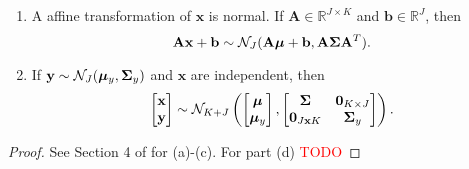 \begin{theorem}
\begin{enumerate}
        \item
            A affine transformation of $\mathbf{x}$ is normal.
            If $\mathbf{A} \in \mathbb{R}^{J \times K}$ and $\mathbf{b} \in \mathbb{R}^{J}$, then
            \begin{equation*}
                \mathbf{Ax} + \mathbf{b} \sim \mathcal{N}_J(
                \mathbf{A} \boldsymbol{\mu} + \mathbf{b},
                \mathbf{A} \boldsymbol{\Sigma} \mathbf{A}^{T}
                ).
            \end{equation*}

        \item
            If $\mathbf{y} \sim \mathcal{N}_J( \boldsymbol{\mu}_y, \boldsymbol{\Sigma}_{y})$ and $\mathbf{x}$ are independent, then
            \begin{equation*}
                \begin{bmatrix}
                    \mathbf{x} \\ \mathbf{y}
                \end{bmatrix} \sim \mathcal{N}_{K + J} \left(
                \begin{bmatrix}
                    \boldsymbol{\mu} \\ \boldsymbol{\mu}_{y}
                \end{bmatrix},
                \begin{bmatrix}
                    \boldsymbol{\Sigma} & \mathbf{0}_{K \times J} \\
                    \mathbf{0}_{J \mathbf{x} K} & \boldsymbol{\Sigma}_y
                \end{bmatrix}\right).
            \end{equation*}
    \end{enumerate}
\end{theorem}
\begin{proof}
    See Section 4 of \cite{murphy2012} for (a)-(c). For part (d) \textcolor{red}{TODO}
\end{proof}
